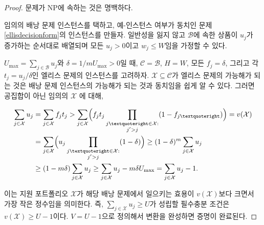 \documentclass[11pt]{article} %
\newif\ifen
\theoremstyle{definition}
\theoremstyle{definition}
\begin{document}
\begin{proof}
\ifen It is obvious that the problem is in NP.
\else 문제가 NP에 속하는 것은 명백하다.\fi

\ifen
Consider an instance of the knapsack problem, and we will construct an instance of Problem \ref{ellisdecisionform} that is a yes-instance if and only if the corresponding knapsack instance is a yes-instance. Without loss of generality, we may assume that the the objects in $\mathcal{B}$ are indexed in increasing order of $u_j$, that each $u_j >0$, and that each $w_j \leq W$. 
\else
임의의 배낭 문제 인스턴스를 택하고, 예-인스턴스 여부가 동치인 문제 \ref{ellisdecisionform}의 인스턴스를 만들자. 일반성을 잃지 않고 $\mathcal{B}$에 속한 상품이 $u_j$가 증가하는 순서대로 배열되며 모든 $u_j >0$이고 $w_j \leq W$임을 가정할 수 있다.
\fi

\ifen
Let $U_{\mathrm{max}} = \sum_{j \in \mathcal{B}} u_j$ and $\delta = {1} /{m U_{\mathrm{max}}} > 0$, and construct an instance of Ellis’s problem with $\mathcal{C} = \mathcal{B}$, $H = W$, all $f_j = \delta$, and each $t_j = u_j / \delta$. Clearly, $\mathcal{X} \subseteq \mathcal{C}$ is feasible for Ellis’s problem if and only if it is feasible for the knapsack instance. Now, we observe that for any nonempty $\mathcal{X}$,
\else
$U_{\mathrm{max}} = \sum_{j \in \mathcal{B}} u_j$와 $\delta = {1} /{m U_{\mathrm{max}}} > 0$일 때, $\mathcal{C} = \mathcal{B}$, $H = W$,  모든 $f_j = \delta$, 그리고 각 $t_j = u_j / \delta$인 엘리스 문제의 인스턴스를 고려하자. $\mathcal{X} \subseteq \mathcal{C}$가 엘리스 문제의 가능해가 되는 것은 배낭 문제 인스턴스의 가능해가 되는 것과 동치임을 쉽게 알 수 있다. 그러면 공집합이 아닌 임의의 $\mathcal{X}$ 에 대해,
\fi
\begin{align}
\begin{split}
\sum_{j \in \mathcal{X}} u_j &=  \sum_{j \in \mathcal{X}} f_j t_j
> \sum_{j \in \mathcal{X}} \Bigl( f_j t_j \prod_{\substack{j’ \in \mathcal{X}: \\ j' > j}} (1 - f_{j’}) \Bigr)
= v(\mathcal{X}) \\
&= \sum_{j \in \mathcal{X}} \Bigl( u_j  \prod_{\substack{j’ \in \mathcal{X}: \\ j' > j}} (1 - \delta) \Bigr)
\geq (1 - \delta)^m \sum_{j \in \mathcal{X}} u_j \\
&\geq (1 - m\delta) \sum_{j \in \mathcal{X}} u_j 
\geq \sum_{j \in \mathcal{X}} u_j  - m\delta U_{\mathrm{max}}
= \sum_{j \in \mathcal{X}} u_j  - 1.
\end{split}
\end{align}
\ifen
This means that the utility of an application portfolio $\mathcal{X}$ in the corresponding knapsack instance is the smallest integer greater than $v( \mathcal{X})$. That is, $\sum_{j \in \mathcal{X}} u_j \geq U$ if and only if $v(\mathcal{X}) \geq U -1$. Taking $V = U-1$ completes the transformation and concludes the proof. 
\else
이는 지원 포트폴리오 $\mathcal{X}$가 해당 배낭 문제에서 일으키는 효용이 $v( \mathcal{X})$보다 크면서 가장 작은 정수임을 의미한다. 즉, $\sum_{j \in \mathcal{X}} u_j \geq U$가 성립할 필수충분 조건은 $v(\mathcal{X}) \geq U -1$이다. $V = U-1$으로 정의해서 변환을 완성하면 증명이 완료된다.
\fi
\end{proof}
\end{document}
